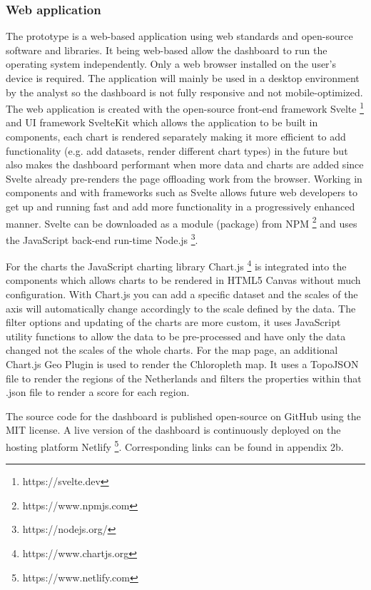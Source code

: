 \subsubsection{Web application}
The prototype is a web-based application using web standards and open-source software and libraries. It being web-based allow the dashboard to run the operating system independently. Only a web browser installed on the user's device is required. The application will mainly be used in a desktop environment by the analyst so the dashboard is not fully responsive and not mobile-optimized. The web application is created with the open-source front-end framework Svelte \footnote{https://svelte.dev} and UI framework SvelteKit which allows the application to be built in components, each chart is rendered separately making it more efficient to add functionality (e.g. add datasets, render different chart types) in the future but also makes the dashboard performant when more data and charts are added since Svelte already pre-renders the page offloading work from the browser. Working in components and with frameworks such as Svelte allows future web developers to get up and running fast and add more functionality in a progressively enhanced manner. Svelte can be downloaded as a module (package) from NPM \footnote{https://www.npmjs.com} and uses the JavaScript back-end run-time Node.js \footnote{https://nodejs.org/}. 

For the charts the JavaScript charting library Chart.js \footnote{https://www.chartjs.org} is integrated into the components which allows charts to be rendered in HTML5 Canvas without much configuration. With Chart.js you can add a specific dataset and the scales of the axis will automatically change accordingly to the scale defined by the data. The filter options and updating of the charts are more custom, it uses JavaScript utility functions to allow the data to be pre-processed and have only the data changed not the scales of the whole charts. For the map page, an additional Chart.js Geo Plugin is used to render the Chloropleth map. It uses a TopoJSON file to render the regions of the Netherlands and filters the properties within that .json file to render a score for each region.

The source code for the dashboard is published open-source on GitHub using the MIT license. A live version of the dashboard is continuously deployed on the hosting platform Netlify \footnote{https://www.netlify.com}. Corresponding links can be found in appendix 2b.

